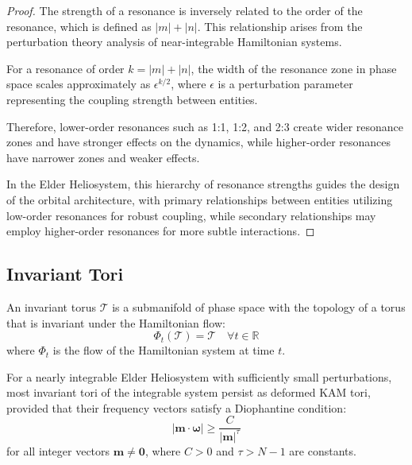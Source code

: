 \begin{proof}
The strength of a resonance is inversely related to the order of the resonance, which is defined as $|m| + |n|$. This relationship arises from the perturbation theory analysis of near-integrable Hamiltonian systems.

For a resonance of order $k = |m| + |n|$, the width of the resonance zone in phase space scales approximately as $\epsilon^{k/2}$, where $\epsilon$ is a perturbation parameter representing the coupling strength between entities.

Therefore, lower-order resonances such as 1:1, 1:2, and 2:3 create wider resonance zones and have stronger effects on the dynamics, while higher-order resonances have narrower zones and weaker effects.

In the Elder Heliosystem, this hierarchy of resonance strengths guides the design of the orbital architecture, with primary relationships between entities utilizing low-order resonances for robust coupling, while secondary relationships may employ higher-order resonances for more subtle interactions.
\end{proof}

\subsection{Invariant Tori}

\begin{definition}
An invariant torus $\mathcal{T}$ is a submanifold of phase space with the topology of a torus that is invariant under the Hamiltonian flow:
\begin{equation}
\Phi_t(\mathcal{T}) = \mathcal{T} \quad \forall t \in \mathbb{R}
\end{equation}
where $\Phi_t$ is the flow of the Hamiltonian system at time $t$.
\end{definition}

\begin{theorem}
For a nearly integrable Elder Heliosystem with sufficiently small perturbations, most invariant tori of the integrable system persist as deformed KAM tori, provided that their frequency vectors satisfy a Diophantine condition:
\begin{equation}
\left| \mathbf{m} \cdot \boldsymbol{\omega} \right| \geq \frac{C}{|\mathbf{m}|^\tau}
\end{equation}
for all integer vectors $\mathbf{m} \neq \mathbf{0}$, where $C > 0$ and $\tau > N-1$ are constants.
\end{theorem}

